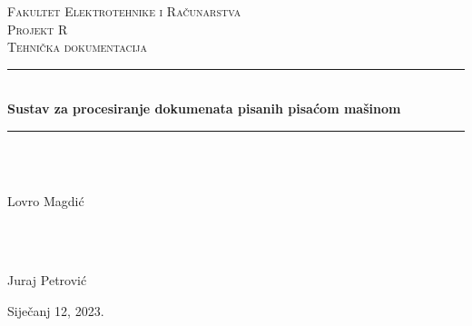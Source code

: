 \documentclass{article}
\begin{document}
\begin{titlepage}
	\newcommand{\HRule}{\rule{\linewidth}{0.5mm}} %
	
	\center %
	
	
	\textsc{\LARGE Fakultet Elektrotehnike i Računarstva}\\[1.5cm] %
	\vfill
	\textsc{\Large Projekt R}\\[0.5cm]
	\textsc{\large Tehnička dokumentacija}\\[0.5cm] %
	\HRule\\[0.4cm]
	{\huge\bfseries Sustav za procesiranje dokumenata pisanih pisaćom mašinom}\\[0.4cm] %
	
	\HRule\\[1.5cm]
	
	
	\begin{minipage}{0.4\textwidth}
		\begin{flushleft}
			\large
			\\
			Lovro Magdić
		\end{flushleft}
	\end{minipage}
	~
	\begin{minipage}{0.4\textwidth}
		\begin{flushright}
			\large
			\\
			Juraj Petrović
		\end{flushright}
	\end{minipage}
        \vfill\vfill
	{\large Siječanj 12, 2023.} %
	\vfill %
\end{titlepage}
\end{document}
